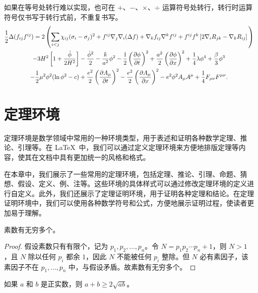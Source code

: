如果在等号处转行难以实现，也可在 $+$、$-$、$\times$、$\div$ 运算符号处转行，转行时运算符号仅书写于转行式前，不重复书写。
\begin{multline}
  \frac{1}{2} \Delta (f_{ij} f^{ij}) =
  2 \left(\sum_{i<j} \chi_{ij}(\sigma_{i} - \sigma_{j})^{2}
  + f^{ij} \nabla_{j} \nabla_{i} (\Delta f)  + \nabla_{k} f_{ij} \nabla^{k} f^{ij} +
  f^{ij} f^{k} \left[2\nabla_{i}R_{jk}- \nabla_{k} R_{ij} \right] \vphantom{\sum_{i<j}} \right) \\
  - 3H^{2}\left[1+\frac{\dot{\phi}}{2H^2}\right] - \frac{\dot{\phi}^{2}}{2} - \frac{k}{a^{2}}\phi^{2} - \frac{1}{2}\left(\frac{\partial\phi}{\partial t}\right)^{2} + \frac{a^2}{2}\left(\frac{\partial\phi}{\partial x}\right)^{2}
  + \frac{1}{4}\lambda\phi^{4} + \frac{\beta}{3}\phi^{3} \\
  -\frac{1}{2}\mu^{2}\phi^{2}(\ln{\phi^{2}} - c)
  + \frac{e^{2}}{2}\left(\frac{\partial A_{\mu}}{\partial t}\right)^{2} - \frac{e^{2}}{2}\left(\frac{\partial A_{\mu}}{\partial x}\right)^{2}
  - e^{2}\phi^{2}A_{\mu}A^{\mu} + \frac{1}{4}F_{\mu\nu}F^{\mu\nu}.
\end{multline}

\section{定理环境}

定理环境是数学领域中常用的一种环境类型，用于表述和证明各种数学定理、推论、引理等。在 \LaTeX\ 中，我们可以通过定义定理环境来方便地排版定理等内容，使其在文档中具有更加统一的风格和格式。

在本章中，我们展示了一些常用的定理环境，包括定理、推论、引理、命题、猜想、假设、定义、例、注等。这些环境的具体样式可以通过修改定理环境的定义进行自定义。此外，我们还展示了定理证明环境，用于证明各种定理和结论。在定理证明环境中，我们可以使用各种数学符号和公式，方便地展示证明过程，使读者更加易于理解。

\begin{thm}
  素数有无穷多个。
\end{thm}

\begin{proof}
  假设素数只有有限个，记为 $p_1, p_2, \dots, p_n$。令 $N = p_1 p_2 \cdots p_n + 1$，则 $N > 1$，且 $N$ 除以任何 $p_i$ 都余 $1$，因此 $N$ 不能被任何 $p_i$ 整除。但 $N$ 必有素因子，该素因子不在 $p_1, \dots, p_n$ 中，与假设矛盾。故素数有无穷多个。
\end{proof}

\begin{cor}
  如果 $a$ 和 $b$ 是正实数，则 $a+b \geq 2\sqrt{ab}$。
\end{cor}


